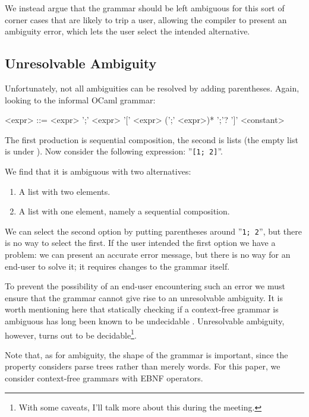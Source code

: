 \documentclass[acmsmall,review,anonymous]{acmart}\settopmatter{printfolios=true,printccs=false,printacmref=false}
\newcommand{\ocaml}{\lstinline[language={[objective]caml}]}
\begin{document}
We instead argue that the grammar should be left ambiguous for this sort of corner cases that are likely to trip a user, allowing the compiler to present an ambiguity error, which lets the user select the intended alternative.

\subsection{Unresolvable Ambiguity}

Unfortunately, not all ambiguities can be resolved by adding parentheses. Again, looking to the informal OCaml grammar:

\setlength{\grammarindent}{5em}
\begin{grammar}
<expr> ::= <expr> ';' <expr>
  \alt '[' <expr> (';' <expr>)* ';'? ']'
  \alt <constant>
\end{grammar}

\noindent The first production is sequential composition, the second is lists (the empty list is under ). Now consider the following expression: ''\ocaml{[1; 2]}''.

We find that it is ambiguous with two alternatives:
\begin{enumerate}
  \item A list with two elements.
  \item A list with one element, namely a sequential composition.
\end{enumerate}

We can select the second option by putting parentheses around ''\ocaml{1; 2}'', but there is no way to select the first. If the user intended the first option we have a problem: we can present an accurate error message, but there is no way for an end-user to solve it; it requires changes to the grammar itself.

To prevent the possibility of an end-user encountering such an error we must ensure that the grammar cannot give rise to an unresolvable ambiguity. It is worth mentioning here that statically checking if a context-free grammar is ambiguous has long been known to be undecidable \cite{cantorAmbiguityProblemBackus1962}. Unresolvable ambiguity, however, turns out to be decidable\footnote{With some caveats, I'll talk more about this during the meeting.}.

Note that, as for ambiguity, the shape of the grammar is important, since the property considers parse trees rather than merely words. For this paper, we consider context-free grammars with EBNF operators.
\end{document}

